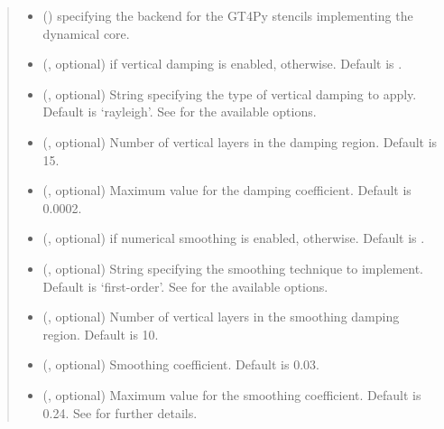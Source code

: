 \documentclass[letterpaper,10pt,english]{sphinxmanual}
\begin{document}
\begin{fulllineitems}
\begin{fulllineitems}
\begin{quote}
\begin{description}
\begin{itemize}
\item {} 
 () \textendash{}  specifying the backend for the GT4Py stencils implementing the dynamical core.

\item {} 
 (, optional) \textendash{}  if vertical damping is enabled,  otherwise. Default is .

\item {} 
 (, optional) \textendash{} String specifying the type of vertical damping to apply. Default is ‘rayleigh’.
See  for the available options.

\item {} 
 (, optional) \textendash{} Number of vertical layers in the damping region. Default is 15.

\item {} 
 (, optional) \textendash{} Maximum value for the damping coefficient. Default is 0.0002.

\item {} 
 (, optional) \textendash{}  if numerical smoothing is enabled,  otherwise. Default is .

\item {} 
 (, optional) \textendash{} String specifying the smoothing technique to implement. Default is ‘first-order’.
See  for the available options.

\item {} 
 (, optional) \textendash{} Number of vertical layers in the smoothing damping region. Default is 10.

\item {} 
 (, optional) \textendash{} Smoothing coefficient. Default is 0.03.

\item {} 
 (, optional) \textendash{} Maximum value for the smoothing coefficient. Default is 0.24.
See  for further details.


\end{itemize}
\end{description}
\end{quote}
\end{fulllineitems}
\end{fulllineitems}
\end{document}
